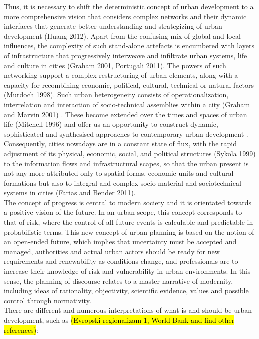\documentclass[11pt]{report}
\begin{document}
Thus, it is necessary to shift the deterministic concept of urban development to a more comprehensive vision that considers complex networks and their dynamic interfaces that generate better understanding and strategizing of urban development (Huang 2012). Apart from the confusing mix of global and local influences, the complexity of such stand-alone artefacts is encumbered with layers of infrastructure that progressively interweave and infiltrate urban systems, life and culture in cities (Graham 2001, Portugali 2011). The powers of such networking support a complex restructuring of urban elements, along with a capacity for recombining economic, political, cultural, technical or natural factors (Murdoch 1998). Such urban heterogeneity consists of operationalization, interrelation and interaction of socio-technical assemblies within a city (Graham and Marvin 2001) . These become extended over the times and spaces of urban life  (Mitchell 1996) and offer us an opportunity to construct dynamic, sophisticated and synthesised approaches to contemporary urban development . Consequently, cities nowadays are in a constant state of flux, with the rapid adjustment of its physical, economic, social, and political structures (Sykola 1999) to the information flows and infrastructural scapes, so that the urban present is not any more attributed only to spatial forms, economic units and cultural formations but also to integral and complex socio-material and sociotechnical systems in cities (Farias and Bender 2011). 
\\
The concept of progress is central to modern society and it is orientated towards a positive vision of the future. In an urban scope, this concept corresponds to that of risk, where the control of all future events is calculable and predictable in probabilistic terms. This new concept of urban planning is based on the notion of an open-ended future, which implies that uncertainty must be accepted and managed, authorities and actual urban actors should be ready for new requirements and renewability as conditions change, and professionals are to increase their knowledge of risk and vulnerability in urban environments. In this sense, the planning of discourse relates to a master narrative of modernity, including ideas of rationality, objectivity, scientific evidence, values and possible control through normativity.
\\
There are different and numerous interpretations of what is and should be urban development, such as \hl{(Evropski regionalizam 1, World Bank and find other references)}:
\end{document}
